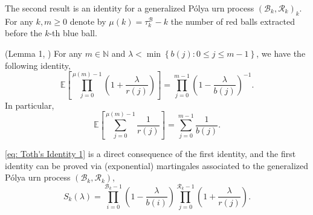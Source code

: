 \documentclass[EJP]{ejpecp} %
\begin{document}
The second result is an identity for a generalized P\'{o}lya urn process $(\mathscr{B}_{k},\mathscr{R}_{k})_k$. For any $k,m\geq 0$ denote by $\mu(k)= \tau^{\mathscr{B}}_k - k$ the number of red balls extracted before the $k$-th blue ball. 
\begin{lemma}(Lemma 1, \cite{T96}) \label{lm: Toth's Identity}
	For any $m\in \mathbb{N}$ and $\lambda < \min\left\{ b(j): 0\leq j\leq m-1 \right\}$, we have the following identity,
	$$  \mathbb{E}\left[  \prod_{j=0}^{ \mu(m)-1 } \left(1+ \frac{\lambda}{r(j)}   \right) \right] =   \prod_{j=0}^{ m-1 } \left(1- \frac{\lambda}{b(j)}   \right)^{-1}.   $$ 
	In particular, 
	\begin{equation}\label{eq: Toth's Identity 1}
		\mathbb{E}\left[  \sum_{j=0}^{ \mu(m)-1 } \frac{1}{r(j)}   \right] =   \sum_{j=0}^{ m-1 } \frac{1}{b(j)}.
	\end{equation}	
\end{lemma}
\eqref{eq: Toth's Identity 1} is a direct consequence of the first identity, and the first identity can be proved via (exponential) martingales associated to the generalized P\'{o}lya urn process $(\mathscr{B}_{k},\mathscr{R}_{k})$, 
\[
S_k(\lambda) = \prod_{i=0}^{ \mathscr{B}_{k}-1 } \left(1-\frac{\lambda}{b(i)}\right) \prod_{j=0}^{\mathscr{R}_{k}-1 } \left(1+\frac{\lambda}{r(j)}\right)
.\]
\end{document}
